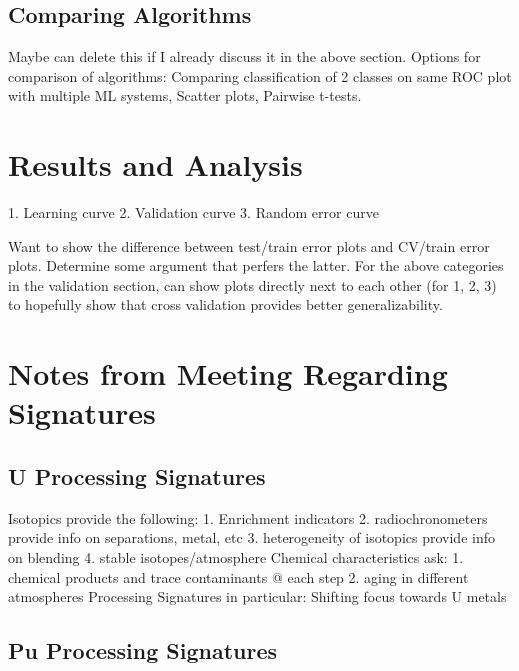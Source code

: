 \documentclass{anstrans}
\begin{document}
\subsection{Comparing Algorithms}

Maybe can delete this if I already discuss it in the above section. Options for
comparison of algorithms: Comparing classification of 2 classes on same ROC
plot with multiple ML systems, Scatter plots, Pairwise t-tests. 

\section{Results and Analysis}

1. Learning curve
2. Validation curve
3. Random error curve

Want to show the difference between test/train error plots and CV/train error
plots.  Determine some argument that perfers the latter. For the above
categories in the validation section, can show plots directly next to each
other (for 1, 2, 3) to hopefully show that cross validation provides better
generalizability.


\section{Notes from Meeting Regarding Signatures}
\subsection{U Processing Signatures}
Isotopics provide the following: 
1. Enrichment indicators
2. radiochronometers provide info on separations, metal, etc
3. heterogeneity of isotopics provide info on blending
4. stable isotopes/atmosphere 
Chemical characteristics ask: 
1. chemical products and trace contaminants @ each step
2. aging in different atmospheres
Processing Signatures in particular:
Shifting focus towards U metals


\subsection{Pu Processing Signatures}
\end{document}
